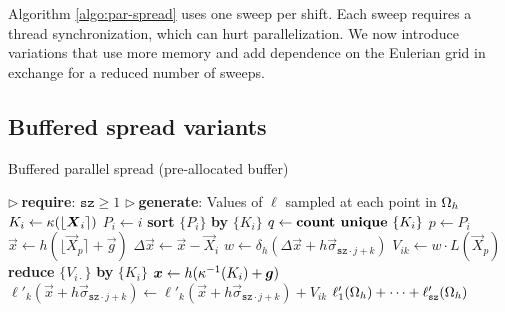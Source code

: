 Algorithm \ref{algo:par-spread} uses one sweep per shift. Each sweep requires a
thread synchronization, which can hurt parallelization. We now introduce
variations that use more memory and add dependence on the Eulerian grid in
exchange for a reduced number of sweeps.

\subsection{Buffered spread variants}

\begin{algorithm}
\caption{Buffered parallel spread (pre-allocated buffer)}
\label{algo:pa-spread}
\begin{algorithmic}[1]
\State $\triangleright\ $\textbf{require}: $\texttt{sz} \ge 1$
\State $\triangleright\ $\textbf{generate}: Values of $\ell$ sampled at each point in $\Omega_h$
    \State $K_i \gets \kappa(\lfloor\boldsymbol{X}_i\rceil)$ 
    \State $P_i \gets i$ 
\EndFor
\State \textbf{sort} $\{P_i\}$ \textbf{by} $\{K_i\}$
\State $q \gets \text{\textbf{count unique} }\{K_i\}$
        \State $p \gets P_i$
        \State $\vec{x} \gets h(\lfloor\vec{X}_p\rceil+\vec{g})$
        \State $\Delta\vec{x} \gets \vec{x}-\vec{X}_i$
            \State $w \gets \delta_h(\Delta\vec{x}+h\vec{\sigma}_{\texttt{sz}\cdot j + k})$
            \State $V_{ik} \gets w \cdot L(\vec{X}_p)$ 
        \EndFor
    \EndFor
    \State \textbf{reduce} $\{V_{i\cdot}\}$ \textbf{by} $\{K_i\}$
        \State $\boldsymbol{x} \gets h(\kappa^{-1}(K_i) + \boldsymbol{g})$
            \State $\ell'_k(\vec{x} + h\vec{\sigma}_{\texttt{sz}\cdot j + k}) \gets
                    \ell'_k(\vec{x} + h\vec{\sigma}_{\texttt{sz}\cdot j + k}) + V_{ik}$
        \EndIf
        \EndFor
    \EndFor
\EndFor
\State \Return $\ell'_1(\Omega_h) + \cdots + \ell'_\texttt{sz}(\Omega_h)$
\EndProcedure
\end{algorithmic}
\end{algorithm}

